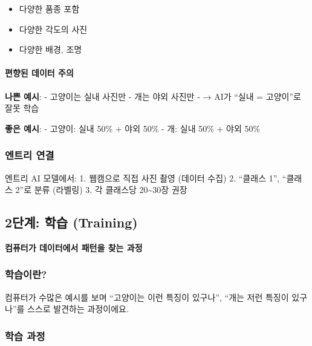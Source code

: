 \documentclass[a4paper, 11pt]{article}
\providecommand{\tightlist}{%
  \setlength{\itemsep}{0pt}\setlength{\parskip}{0pt}}
\renewenvironment{quote}
  {\begin{tcolorbox}[colback=lightblue!30, colframe=mainblue!50,
   left=8pt, right=8pt, top=4pt, bottom=4pt, breakable]}
  {\end{tcolorbox}}
\begin{document}
\begin{itemize}
\tightlist
\item
  다양한 품종 포함
\item
  다양한 각도의 사진
\item
  다양한 배경, 조명
\end{itemize}

\hypertarget{uxd3b8uxd5a5uxb41c-uxb370uxc774uxd130-uxc8fcuxc758}{%
\paragraph{ 편향된 데이터
주의}\label{uxd3b8uxd5a5uxb41c-uxb370uxc774uxd130-uxc8fcuxc758}}

\textbf{나쁜 예시}: - 고양이는 실내 사진만 - 개는 야외 사진만 - → AI가
``실내 = 고양이''로 잘못 학습

\textbf{좋은 예시}: - 고양이: 실내 50\% + 야외 50\% - 개: 실내 50\% +
야외 50\%

\hypertarget{uxc5d4uxd2b8uxb9ac-uxc5f0uxacb0}{%
\subsubsection{엔트리 연결}\label{uxc5d4uxd2b8uxb9ac-uxc5f0uxacb0}}

엔트리 AI 모델에서: 1. 웹캠으로 직접 사진 촬영 (데이터 수집) 2. ``클래스
1'', ``클래스 2''로 분류 (라벨링) 3. 각 클래스당 20\textasciitilde30장
권장

\hypertarget{uxb2e8uxacc4-uxd559uxc2b5-training}{%
\subsection{2단계: 학습
(Training)}\label{uxb2e8uxacc4-uxd559uxc2b5-training}}

\begin{quote}
\textbf{컴퓨터가 데이터에서 패턴을 찾는 과정}
\end{quote}

\hypertarget{uxd559uxc2b5uxc774uxb780}{%
\subsubsection{학습이란?}\label{uxd559uxc2b5uxc774uxb780}}

컴퓨터가 수많은 예시를 보며 ``고양이는 이런 특징이 있구나'', ``개는 저런
특징이 있구나''를 스스로 발견하는 과정이에요.

\hypertarget{uxd559uxc2b5-uxacfcuxc815}{%
\subsubsection{학습 과정}\label{uxd559uxc2b5-uxacfcuxc815}}
\end{document}
